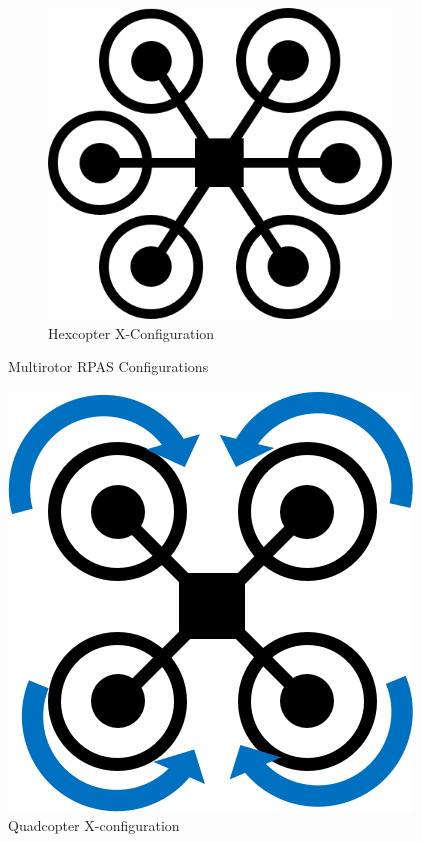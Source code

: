 \begin{figure}[b]
\begin{subfigure}[b]{0.3\textwidth}
		\includegraphics[scale=0.4]{img/drone_hexconfig}
		\caption{Hexcopter X-Configuration}
		\label{fig:hexcopter-x}
	\end{subfigure}
	
	\caption{Multirotor RPAS Configurations}
	\label{fig:rpas-config}
\end{figure}

\begin{figure}[h]
	\centering
	\includegraphics[scale=0.4]{img/drone_xconfigt}
	\caption{Quadcopter X-configuration}
	\label{fig:quadcopter-x-t}
\end{figure}

